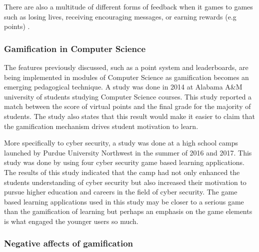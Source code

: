 \documentclass[12pt,a4paper]{article}
\begin{document}
There are also a multitude of different forms of feedback when it games to games such as losing lives, receiving encouraging messages, or earning rewards (e.g points) \cite{adams2015cybersecurity2}.


\subsubsection{Gamification in Computer Science} 
The features previously discussed, such as a point system and leaderboards, are being implemented in modules of Computer Science as gamification becomes an emerging pedagogical technique. A study was done in 2014 at Alabama A\&M university \cite{fu2016gamification} of students studying Computer Science courses. This study reported a match between the score of virtual points and the final grade for the majority of students. The study also states that this result would make it easier to claim that the gamification mechanism drives student motivation to learn.  

More specifically to cyber security, a study was done at a high school camps launched by Purdue University Northwest in the summer of 2016 and 2017\cite{jin2018evaluation}. This study was done by using four cyber security game based learning applications. The results of this study indicated that the camp had not only enhanced the students understanding of cyber security but also increased their motivation to pursue higher education and careers in the field of cyber security. The game based learning applications used in this study may be closer to a serious game than the gamification of learning but perhaps an emphasis on the game elements is what engaged the younger users so much.  

\subsubsection{Negative affects of gamification} 
\end{document}
